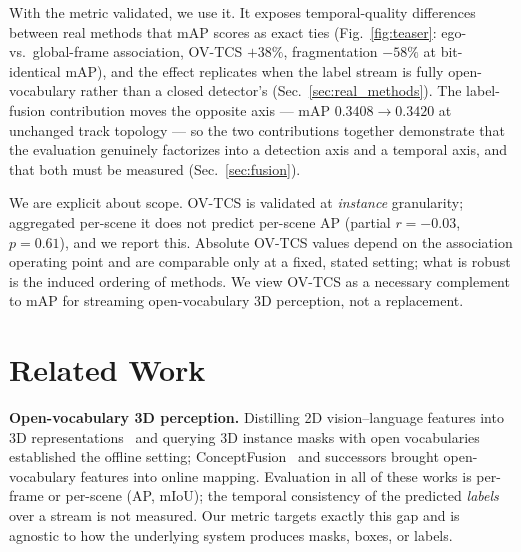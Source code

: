 \documentclass[10pt,twocolumn,letterpaper]{article}
\begin{document}
With the metric validated, we use it. It exposes temporal-quality differences
between real methods that mAP scores as exact ties (Fig.~\ref{fig:teaser}:
ego- vs.\ global-frame association, OV-TCS $+38\%$, fragmentation $-58\%$ at
bit-identical mAP), and the effect replicates when the label stream is fully
open-vocabulary rather than a closed detector's
(Sec.~\ref{sec:real_methods}). The label-fusion contribution moves the
opposite axis --- mAP $0.3408\to0.3420$ at unchanged track topology --- so
the two contributions together demonstrate that the evaluation genuinely
factorizes into a detection axis and a temporal axis, and that both must be
measured (Sec.~\ref{sec:fusion}).

We are explicit about scope. OV-TCS is validated at \emph{instance}
granularity; aggregated per-scene it does not predict per-scene AP (partial
$r{=}-0.03$, $p{=}0.61$), and we report this. Absolute OV-TCS values depend on
the association operating point and are comparable only at a fixed, stated
setting; what is robust is the induced ordering of methods. We view OV-TCS as
a necessary complement to mAP for streaming open-vocabulary 3D perception,
not a replacement.

\section{Related Work}
\label{sec:related}

\noindent\textbf{Open-vocabulary 3D perception.}
Distilling 2D vision--language features into 3D
representations~\cite{openscene,lerf} and querying 3D instance masks with
open vocabularies~\cite{openmask3d,openyolo3d} established the offline
setting; ConceptFusion~\cite{conceptfusion} and successors brought
open-vocabulary features into online mapping. Evaluation in all of these
works is per-frame or per-scene (AP, mIoU); the temporal consistency of the
predicted \emph{labels} over a stream is not measured. Our metric targets
exactly this gap and is agnostic to how the underlying system produces masks,
boxes, or labels.
\end{document}
